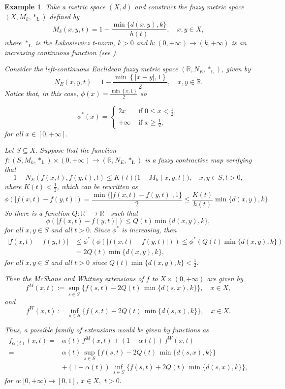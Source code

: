 \documentclass[12pt]{amsart}
\newtheorem{example}[theorem]{Example}
\begin{document}
	\begin{example}
		Take a metric space $(X,d)$ and  construct the fuzzy metric space  $(X,M_k,\ast_{\text{\L}})$  defined by
		$$
		M_k(x,y,t)= 1- \frac{\min\{d(x,y),k\}}{h(t)}, \quad x,y\in X,
		$$
		where $\ast_{\text{\L}}$ is the \L ukasiewicz t-norm, $k>0$ and $h:(0,+\infty)\to (k,+\infty)$ is an increasing continuous function (see \cite[Example 6]{GregMoriSape10}).
		
		Consider the left-continuous Euclidean fuzzy metric space $(\mathbb{R},N_E,\ast_{\text{\L}})$, given by
		$$
		N_E(x,y,t)= 1-\frac{\min\left\{|x-y|,1\right\}}{2}, \quad x,y \in \mathbb{R}.
		$$
		Notice that, in this case, $\phi(x)=\frac{\min\left\{x,1\right\}}{2}$ so
		
		$$\phi^*(x)=\begin{cases}2x&\text{ if }0\leq x<\frac{1}{2},\\
			+\infty&\text{ if }x\geq \frac{1}{2},\end{cases}$$ for all $x\in [0,+\infty].$ 
		
		
		Let $S \subseteq X.$
		Suppose that the  function $f:(S,M_k,\ast_{\text{\L}})\times (0,+\infty) \to (\mathbb{R},N_E, \ast_{\text{\L}})$ is a fuzzy contractive map verifying that 
		$$1- N_E(f(x,t),f(y,t),t) \le K(t) \big( 1- M_k(x,y,t) \big), \quad x, y \in S, t>0,
		$$
		where $K(t)<\frac{1}{2}$, which can be rewritten as
		$$\phi(|f(x,t)-f(y,t)|)=\frac{\min\{|f(x,t)-f(y,t)|,1\}}{2}\leq \frac{K(t)}{h(t)}\min\{d(x,y),k\}.$$
		So there is a function $Q:\mathbb{R}^+\to\mathbb{R}^+$ such that
		$$\phi(|f(x,t)-f(y,t)|)\leq Q(t)\min\{d(x,y),k\},$$
		for all $x,y\in S$ and all $t>0.$ Since $\phi^*$ is increasing, then
		\begin{align*}
			|f(x,t)-f(y,t)|&\leq \phi^*(\phi(|f(x,t)-f(y,t)|) )\leq \phi^*(Q(t)\min\{d(x,y),k\})\\
			&=2Q(t)\min\{d(x,y),k\},
		\end{align*}
		for all $x,y\in S$ and all $t>0$ since $Q(t)\min\{d(x,y),k\}<\frac{1}{2}.$ 
		
		
		
		Then the McShane and Whitney extensions of $f$ to $X\times (0,+\infty)$ are given by
		$$
		{{f^M}}(x,t):=\sup_{s\in S}\big\{f(s,t)-2Q(t) \,\min\{d(s,x),k\}\big\}, \quad x \in X,
		$$
		and
		$$
		f^W(x,t):=\inf_{s\in S}\big\{f(s,t)+2Q(t) \,\min\{d(s,x),k\}\big\}, \quad x \in X.
		$$
		
		
		Thus, a possible family of extensions would be given by functions as
		\begin{align*}
			f_{\alpha(t)}(x,t) =& \alpha(t) \, {{f^M}}(x,t) + (1-\alpha(t) )\, {{f^W}}(x,t)
			\\
			=&
			\alpha(t) \, \sup_{s\in S}\big\{f(s,t)-2Q(t) \,\min\{d(s,x),k\}\big\}  \\&+ (1-\alpha(t) )\, \inf_{s\in S}\big\{f(s,t)+2Q(t) \,\min\{d(s,x),k\}\big\},
		\end{align*}
		for $\alpha: [0,+\infty) \to [0,1]$,	$x \in X,$ $t>0.$
		
		
	\end{example}	
	
\end{document}
